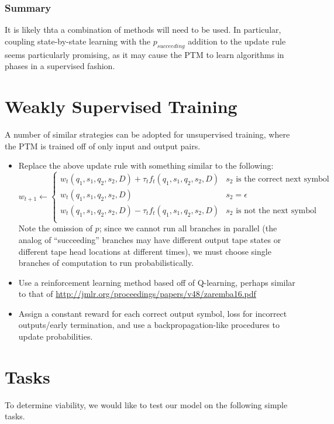 \documentclass{article}
\begin{document}
\subsubsection{Summary}
It is likely thta a combination of methods will need to be used. In particular, coupling state-by-state learning with the $p_{succeeding}$ addition to the update rule seems particularly promising, as it may cause the PTM to learn algorithms in phases in a supervised fashion.

\section{Weakly Supervised Training}

A number of similar strategies can be adopted for unsupervised training, where the PTM is trained off of only input and output pairs. 

\begin{itemize}
    \item Replace the above update rule with something similar to the following:
\[ w_{t+1}\leftarrow 
\begin{cases}
    w_t(q_1, s_1, q_2, s_2, D) + \tau_tf_t(q_1, s_1, q_2, s_2, D) & \text{$s_2$ is the correct next symbol}\\
    w_t(q_1, s_1, q_2, s_2, D) & \text{$s_2 = \epsilon$}\\
    w_t(q_1, s_1, q_2, s_2, D) - \tau_tf_t(q_1, s_1, q_2, s_2, D) & \text{$s_2$ is not the next symbol}\\
\end{cases}
\]
    Note the omission of $p$; since we cannot run all branches in parallel (the analog of ``succeeding'' branches may have different output tape states or different tape head locations at different times), we must choose single branches of computation to run probabilistically. 
    \item Use a reinforcement learning method based off of Q-learning, perhaps similar to that of \url{http://jmlr.org/proceedings/papers/v48/zaremba16.pdf}
    \item Assign a constant reward for each correct output symbol,  loss for incorrect outputs/early termination, and use a backpropagation-like procedures to update probabilities.
\end{itemize}

\section{Tasks}
To determine viability, we would like to test our model on the following simple tasks.
\end{document}
